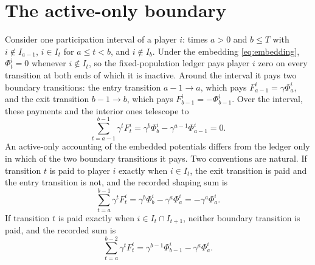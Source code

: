 \documentclass{article}
\begin{document}
\section{The active-only boundary}

Consider one participation interval of a player \(i\): times \(a>0\) and \(b\le T\) with \(i\notin I_{a-1}\), \(i\in I_t\) for \(a\le t<b\), and \(i\notin I_b\). Under the embedding \eqref{eq:embedding}, \(\Phi_t^i=0\) whenever \(i\notin I_t\), so the fixed-population ledger pays player \(i\) zero on every transition at both ends of which it is inactive. Around the interval it pays two boundary transitions: the entry transition \(a-1\to a\), which pays \(F_{a-1}^i=\gamma\Phi_a^i\), and the exit transition \(b-1\to b\), which pays \(F_{b-1}^i=-\Phi_{b-1}^i\). Over the interval, these payments and the interior ones telescope to
\begin{equation}
 \sum_{t=a-1}^{b-1}\gamma^t F_t^i
 =\gamma^b\Phi_b^i-\gamma^{a-1}\Phi_{a-1}^i=0.
 \label{eq:full}
\end{equation}
An active-only accounting of the embedded potentials differs from the ledger only in which of the two boundary transitions it pays. Two conventions are natural. If transition \(t\) is paid to player \(i\) exactly when \(i\in I_t\), the exit transition is paid and the entry transition is not, and the recorded shaping sum is
\begin{equation}
 \sum_{t=a}^{b-1}\gamma^t F_t^i
 =\gamma^b\Phi_b^i-\gamma^a\Phi_a^i
 =-\gamma^a\Phi_a^i.
 \label{eq:boundary-a}
\end{equation}
If transition \(t\) is paid exactly when \(i\in I_t\cap I_{t+1}\), neither boundary transition is paid, and the recorded sum is
\begin{equation}
 \sum_{t=a}^{b-2}\gamma^t F_t^i
 =\gamma^{b-1}\Phi_{b-1}^i-\gamma^a\Phi_a^i.
 \label{eq:boundary-b}
\end{equation}
\end{document}
